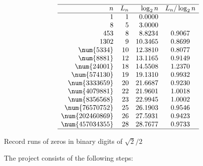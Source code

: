 \documentclass[oneside,10pt]{book}
\renewcommand{\arraystretch}{1.4} %
\begin{document}
\begin{table}[H]
\small
\setlength\extrarowheight{-2pt}
\[
\begin{array}{rrrc}
\hline
 n & L_n & \log_2 n & L_n / \log_2 n \\
\hline
1	&	1	&	0.0000	&		\\
8	&	5	&	3.0000	&		\\
453	&	8	&	8.8234	&	0.9067	\\
1302	&	9	&	10.3465	&	0.8699	\\
\num{5334}	&	10	&	12.3810	&	0.8077	\\
\num{8881}	&	12	&	13.1165	&	0.9149	\\
\num{24001}	&	18	&	14.5508	&	1.2370	\\
\num{574130}	&	19	&	19.1310	&	0.9932	\\
\num{3333659}	&	20	&	21.6687	&	0.9230	\\
\num{4079881}	&	22	&	21.9601	&	1.0018	\\
\num{8356568}	&	23	&	22.9945	&	1.0002	\\
\num{76570752}	&	25	&	26.1903	&	0.9546	\\
\num{202460869}	&	26	&	27.5931	&	0.9423	\\
\num{457034355}	&	28	&	28.7677	&	0.9733	\\
\hline
\end{array}
\]
\caption{\label{tafghurds} Record runs of zeros in binary digits of $\sqrt{2}/2$}
\end{table}

\noindent The project consists of the following steps: \vspace{1ex}
\end{document}
